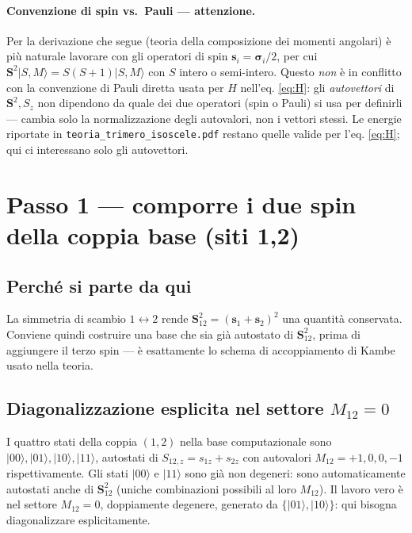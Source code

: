 \documentclass[11pt,a4paper]{article}
\newcommand{\ket}[1]{\lvert #1\rangle}
\newcommand{\vs}[1]{\mathbf{s}_{#1}}
\begin{document}
\paragraph{Convenzione di spin vs.\ Pauli — attenzione.} Per la derivazione che
segue (teoria della composizione dei momenti angolari) è più naturale lavorare
con gli operatori di spin $\vs{i}=\boldsymbol\sigma_i/2$, per cui $\mathbf
S^2\ket{S,M}=S(S+1)\ket{S,M}$ con $S$ intero o semi-intero. Questo \emph{non}
è in conflitto con la convenzione di Pauli diretta usata per $H$ nell'eq.
\eqref{eq:H}: gli \emph{autovettori} di $\mathbf S^2,S_z$ non dipendono da
quale dei due operatori (spin o Pauli) si usa per definirli — cambia solo la
normalizzazione degli autovalori, non i vettori stessi. Le energie riportate
in \texttt{teoria\_trimero\_isoscele.pdf} restano quelle valide per l'eq.
\eqref{eq:H}; qui ci interessano solo gli autovettori.

\section{Passo 1 — comporre i due spin della coppia base (siti 1,2)}

\subsection{Perché si parte da qui}

La simmetria di scambio $1\leftrightarrow2$ rende $\mathbf S_{12}^2=(\vs1+\vs2)^2$
una quantità conservata. Conviene quindi costruire una base che sia già
autostato di $\mathbf S_{12}^2$, prima di aggiungere il terzo spin — è
esattamente lo schema di accoppiamento di Kambe usato nella teoria.

\subsection{Diagonalizzazione esplicita nel settore $M_{12}=0$}

I quattro stati della coppia $(1,2)$ nella base computazionale sono $\ket{00},\ket{01},\ket{10},\ket{11}$,
autostati di $S_{12,z}=s_{1z}+s_{2z}$ con autovalori $M_{12}=+1,0,0,-1$
rispettivamente. Gli stati $\ket{00}$ e $\ket{11}$ sono già non degeneri: sono
automaticamente autostati anche di $\mathbf S_{12}^2$ (uniche combinazioni
possibili al loro $M_{12}$). Il lavoro vero è nel settore $M_{12}=0$, doppiamente
degenere, generato da $\{\ket{01},\ket{10}\}$: qui bisogna diagonalizzare
esplicitamente.
\end{document}

